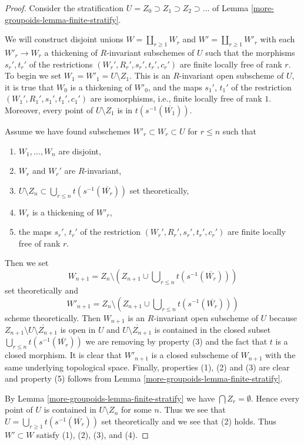 \begin{proof}
Consider the stratification $U = Z_0 \supset Z_1 \supset Z_2 \supset \ldots$
of Lemma \ref{more-groupoids-lemma-finite-stratify}.

\medskip\noindent
We will construct disjoint unions $W = \coprod_{r \geq 1} W_r$ and
$W' = \coprod_{r \geq 1} W'_r$ with each $W'_r \to W_r$ a thickening
of $R$-invariant subschemes of $U$ such that the morphisms
$s_r', t_r'$ of the restrictions $(W_r', R_r', s_r', t_r', c_r')$
are finite locally free of rank $r$. To begin we set
$W_1 = W'_1 = U \setminus Z_1$. This is an $R$-invariant open
subscheme of $U$, it is true that $W_0$ is a thickening of $W'_0$,
and the maps $s_1'$, $t_1'$ of the
restriction $(W_1', R_1', s_1', t_1', c_1')$ are isomorphisms, i.e.,
finite locally free of rank $1$.
Moreover, every point of $U \setminus Z_1$ is in $t(s^{-1}(\overline{W_1}))$.

\medskip\noindent
Assume we have found subschemes $W'_r \subset W_r \subset U$ for $r \leq n$
such that
\begin{enumerate}
\item $W_1, \ldots, W_n$ are disjoint,
\item $W_r$ and $W_r'$ are $R$-invariant,
\item $U \setminus Z_n \subset \bigcup_{r \leq n} t(s^{-1}(\overline{W_r}))$
set theoretically,
\item $W_r$ is a thickening of $W'_r$,
\item the maps $s_r'$, $t_r'$ of the restriction
$(W_r', R_r', s_r', t_r', c_r')$ are finite locally free of rank $r$.
\end{enumerate}
Then we set
$$
W_{n + 1} = Z_n \setminus
\left(
Z_{n + 1} \cup \bigcup\nolimits_{r \leq n} t(s^{-1}(\overline{W_r}))
\right)
$$
set theoretically and
$$
W'_{n + 1} = Z_n \setminus
\left(
Z_{n + 1} \cup \bigcup\nolimits_{r \leq n} t(s^{-1}(\overline{W_r}))
\right)
$$
scheme theoretically. Then $W_{n + 1}$ is an $R$-invariant open subscheme
of $U$ because $Z_{n + 1} \setminus \overline{U \setminus Z_{n + 1}}$
is open in $U$ and $\overline{U \setminus Z_{n + 1}}$ is contained
in the closed subset $\bigcup\nolimits_{r \leq n} t(s^{-1}(\overline{W_r}))$
we are removing by property (3) and the fact that $t$ is a closed morphism.
It is clear that $W'_{n + 1}$ is a closed subscheme
of $W_{n + 1}$ with the same underlying topological space.
Finally, properties (1), (2) and (3) are clear and property (5) follows from
Lemma \ref{more-groupoids-lemma-finite-stratify}.

\medskip\noindent
By Lemma \ref{more-groupoids-lemma-finite-stratify} we have $\bigcap Z_r = \emptyset$.
Hence every point of $U$ is contained in $U \setminus Z_n$
for some $n$. Thus we see that
$U = \bigcup_{r \geq 1} t(s^{-1}(\overline{W_r}))$
set theoretically and we see that (2) holds.
Thus $W' \subset W$ satisfy (1), (2), (3), and (4).
\end{proof}

